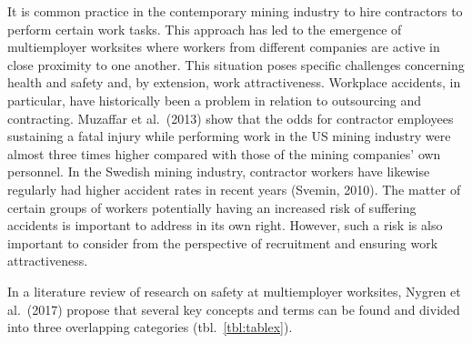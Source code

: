 \documentclass[
  12pt,
]{scrbook}
\begin{document}
It is common practice in the contemporary mining industry to hire contractors to perform certain work tasks. This approach has led to the emergence of multiemployer worksites where workers from different companies are active in close proximity to one another. This situation poses specific challenges concerning health and safety and, by extension, work attractiveness. Workplace accidents, in particular, have historically been a problem in relation to outsourcing and contracting. Muzaffar et al.~(2013) show that the odds for contractor employees sustaining a fatal injury while performing work in the US mining industry were almost three times higher compared with those of the mining companies' own personnel. In the Swedish mining industry, contractor workers have likewise regularly had higher accident rates in recent years (Svemin, 2010). The matter of certain groups of workers potentially having an increased risk of suffering accidents is important to address in its own right. However, such a risk is also important to consider from the perspective of recruitment and ensuring work attractiveness.

In a literature review of research on safety at multiemployer worksites, Nygren et al.~(2017) propose that several key concepts and terms can be found and divided into three overlapping categories (tbl.~\ref{tbl:tablex}).
\end{document}
